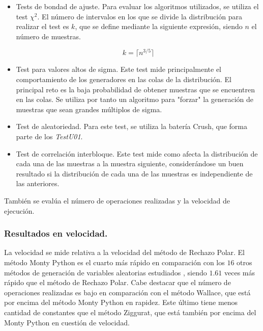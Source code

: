\documentclass[a4paper,12pt]{article}
\begin{document}
	
	\begin{itemize}

		\item Tests de bondad de ajuste. Para evaluar los algoritmos utilizados, se utiliza el test $\chi^{2}$. El número de intervalos en los que se divide la distribución para realizar el test es $k$, que se define mediante la siguiente expresión, siendo $n$ el número de muestras.

		\vspace{-5mm}
		$$k = \lceil n^{3/5} \rceil $$
		
		\item Test para valores altos de sigma. Este test mide principalmente el comportamiento de los generadores en las colas de la distribución. El principal reto es la baja probabilidad de obtener muestras que se encuentren en las colas. Se utiliza por tanto un algoritmo para "forzar" la generación de muestras que sean grandes múltiplos de sigma. 

		
		\item Test de aleatoriedad. Para este test, se utiliza la batería Crush, que forma parte de los \textit{TestU01}.

		
		\item Test de correlación interbloque. Este test mide como afecta la distribución de cada una de las muestras a la muestra siguiente, considerándose un buen resultado si la distribución de cada una de las muestras es independiente de las anteriores.

	\end{itemize}

	
	También se evalúa el número de operaciones realizadas y la velocidad de ejecución. 
	
	\subsubsection{Resultados en velocidad.}
	La velocidad se mide relativa a la velocidad del método de Rechazo Polar. El método Monty Python es el cuarto más rápido en comparación con los $16$ otros métodos de generación de variables aleatorias estudiados \cite{comparacion-metodos}, siendo $1.61$ veces más rápido que el método de Rechazo Polar. Cabe destacar que el número de operaciones realizadas es bajo en comparación con el método Wallace, que está por encima del método Monty Python en rapidez. Este último tiene menos cantidad de constantes que el método Ziggurat, que está también por encima del Monty Python en cuestión de velocidad.
	
\end{document}
